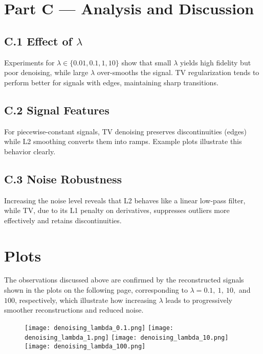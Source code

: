 \documentclass[11pt,a4paper]{article}
\begin{document}
\section*{Part C — Analysis and Discussion}
\subsection*{C.1 Effect of \texorpdfstring{$\lambda$}{lambda}}
Experiments for \(\lambda \in\{0.01, 0.1, 1, 10\}\) show that small \(\lambda\) yields high fidelity but poor denoising, while large \(\lambda\) over-smooths the signal. TV regularization tends to perform better for signals with edges, maintaining sharp transitions.

\subsection*{C.2 Signal Features}
For piecewise-constant signals, TV denoising preserves discontinuities (edges) while L2 smoothing converts them into ramps. Example plots illustrate this behavior clearly.

\subsection*{C.3 Noise Robustness}
Increasing the noise level reveals that L2 behaves like a linear low-pass filter, while TV, due to its L1 penalty on derivatives, suppresses outliers more effectively and retains discontinuities.

\section*{Plots}
The observations discussed above are confirmed by the reconstructed signals shown in the plots on the following page, corresponding to $\lambda = 0.1,\ 1,\ 10,$ and $100$, respectively, which illustrate how increasing $\lambda$ leads to progressively smoother reconstructions and reduced noise.

\begin{figure}[H]
    \centering
    \texttt{[image: denoising\_lambda\_0.1.png]}
    \texttt{[image: denoising\_lambda\_1.png]}
    \texttt{[image: denoising\_lambda\_10.png]}
    \texttt{[image: denoising\_lambda\_100.png]}
\end{figure}
\end{document}
